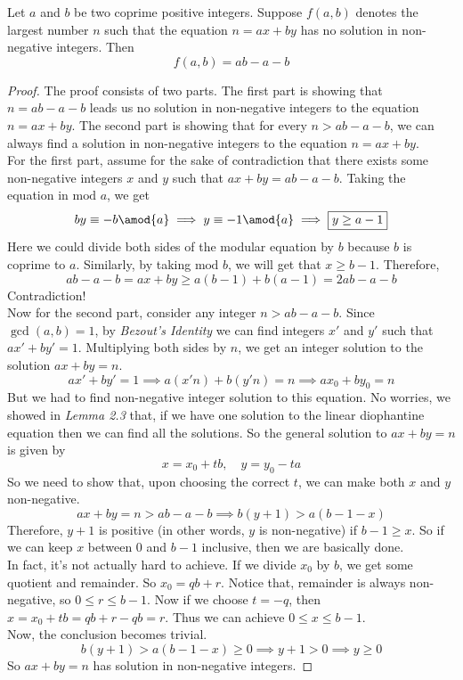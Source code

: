 \documentclass[11pt]{scrartcl}
\begin{document}
\begin{theorem}
Let \(a\) and \(b\) be two coprime positive integers. Suppose \(f(a,b)\) denotes the largest number \(n\) such that the equation \(n = ax+by\) has no solution in non-negative integers. Then \[f(a,b) = ab - a - b\]
\end{theorem}
\begin{proof}
The proof consists of two parts. The first part is showing that \(n = ab - a - b\) leads us no solution in non-negative integers to the equation \(n = ax+by\). The second part is showing that for every \(n> ab - a - b\), we can always find a solution in non-negative integers to the equation \(n = ax+by\). \\
For the first part, assume for the sake of contradiction that there exists some non-negative integers \(x\) and \(y\) such that \(ax + by = ab - a - b\). Taking the equation in \(\text{mod }a\), we get
\[by \equiv -b \amod{a} \implies y \equiv -1 \amod{a} \implies \boxed{y \geq a-1}\]
Here we could divide both sides of the modular equation by \(b\) because \(b\) is coprime to \(a\). Similarly, by taking \(\text{mod }b\), we will get that \(\boxed{x \geq b-1}\). Therefore, 
\[ab - a - b = ax + by \geq a(b-1) + b(a-1) = 2ab - a -b\]
Contradiction!\\
Now for the second part, consider any integer \(n > ab - a -b\). Since \(\gcd(a,b)=1\), by \textit{Bezout's Identity} we can find integers \(x'\) and \(y'\) such that \(ax' + by' = 1\). Multiplying both sides by \(n\), we get an integer solution to the solution \(ax+by=n\).
\[ax' + by' = 1 \implies a(x'n) + b(y'n) = n \implies ax_0 + by_0 = n\]
But we had to find non-negative integer solution to this equation. No worries, we showed in \textit{Lemma 2.3} that, if we have one solution to the linear diophantine equation then we can find all the solutions. So the general solution to \(ax+by = n\) is given by
\[x = x_0 + tb, \quad y = y_0 - ta\]
So we need to show that, upon choosing the correct \(t\), we can make both \(x\) and \(y\) non-negative.
\[ax+by = n > ab-a-b \implies \boxed{b(y+1) > a(b -1 -x)}\]
Therefore, \(y+1\) is positive (in other words, \(y\) is non-negative) if \(b-1 \geq x\). So if we can keep \(x\) between \(0\) and \(b-1\) inclusive, then we are basically done. \\
In fact, it's not actually hard to achieve. If we divide \(x_0\) by \(b\), we get some quotient and remainder. So \(x_0 = qb + r\). Notice that, remainder is always non-negative, so \(0\leq r \leq b-1\). Now if we choose \(t = -q\), then \(x = x_0 + tb = qb + r -qb = r\). Thus we can achieve \(0 \leq x \leq b-1\). \\
Now, the conclusion becomes trivial. 
\[b(y+1) > a(b -1 -x) \geq 0 \implies y+1 >0 \implies y \geq 0\]
So \(ax+by=n\) has solution in non-negative integers.
\end{proof}
\end{document}
